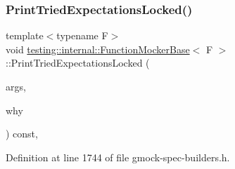\subsubsection{\texorpdfstring{Print\+Tried\+Expectations\+Locked()}{PrintTriedExpectationsLocked()}}
{\footnotesize\ttfamily template$<$typename F$>$ \\
void \hyperlink{classtesting_1_1internal_1_1FunctionMockerBase}{testing\+::internal\+::\+Function\+Mocker\+Base}$<$ F $>$\+::Print\+Tried\+Expectations\+Locked (\begin{DoxyParamCaption}\item[{const \hyperlink{classtesting_1_1internal_1_1FunctionMockerBase_a336432a07e544af4ffb8103603471ca3}{Argument\+Tuple} \&}]{args,  }\item[{\+::std\+::ostream $\ast$}]{why }\end{DoxyParamCaption}) const\hspace{0.3cm}{\ttfamily [inline]}, {\ttfamily [private]}}



Definition at line 1744 of file gmock-\/spec-\/builders.\+h.


